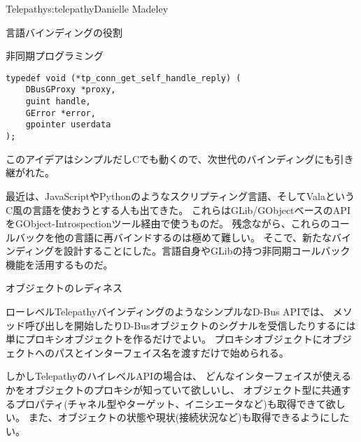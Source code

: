 \begin{aosachapter}{Telepathy}{s:telepathy}{Danielle Madeley}
\begin{aosasect1}{言語バインディングの役割}
\begin{aosasect2}{非同期プログラミング}
\begin{verbatim}
typedef void (*tp_conn_get_self_handle_reply) (
    DBusGProxy *proxy,
    guint handle,
    GError *error,
    gpointer userdata
);
\end{verbatim}

\noindent
このアイデアはシンプルだしCでも動くので、次世代のバインディングにも引き継がれた。

最近は、JavaScriptやPythonのようなスクリプティング言語、そしてValaというC風の言語を使おうとする人も出てきた。
これらはGLib/GObjectベースのAPIをGObject-Introspectionツール経由で使うものだ。
残念ながら、これらのコールバックを他の言語に再バインドするのは極めて難しい。
そこで、新たなバインディングを設計することにした。言語自身やGLibの持つ非同期コールバック機能を活用するものだ。

\end{aosasect2}

\begin{aosasect2}{オブジェクトのレディネス}
\label{sec.telepathy.readiness}

ローレベルTelepathyバインディングのようなシンプルなD-Bus APIでは、
メソッド呼び出しを開始したりD-Busオブジェクトのシグナルを受信したりするには
単にプロキシオブジェクトを作るだけでよい。
プロキシオブジェクトにオブジェクトへのパスとインターフェイス名を渡すだけで始められる。

しかしTelepathyのハイレベルAPIの場合は、
どんなインターフェイスが使えるかをオブジェクトのプロキシが知っていて欲しいし、
オブジェクト型に共通するプロパティ(チャネル型やターゲット、イニシエータなど)も取得できて欲しい。
また、オブジェクトの状態や現状(接続状況など)も取得できるようにしたい。


\end{aosasect2}
\end{aosasect1}
\end{aosachapter}
